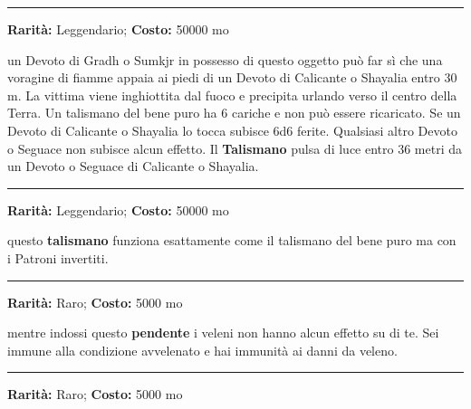 \begin{multicols}{2}
\smallskip\noindent\rule{\linewidth}{2pt}  \hypertarget{TalismanodelBenepuro}{}\smallskip{}\noindent\label{TalismanodelBenepuro}

\textbf{Rarità:} Leggendario; \textbf{Costo:} 50000 mo

un Devoto di Gradh o Sumkjr in possesso di questo oggetto può far sì che una voragine di fiamme appaia ai piedi di un Devoto di Calicante o Shayalia entro 30 m. La vittima viene inghiottita dal fuoco e precipita urlando verso il centro della Terra. Un talismano del bene puro ha 6 cariche e non può essere ricaricato. Se un Devoto di Calicante o Shayalia lo tocca subisce 6d6 ferite. Qualsiasi altro Devoto o Seguace non subisce alcun effetto. Il \textbf{Talismano} pulsa di luce entro 36 metri da un Devoto o Seguace di Calicante o Shayalia.

\smallskip\noindent\rule{\linewidth}{2pt}  \hypertarget{TalismanodelMaleestremo}{}\smallskip{}\noindent\label{TalismanodelMaleestremo}

\textbf{Rarità:} Leggendario; \textbf{Costo:} 50000 mo

questo \textbf{talismano} funziona esattamente come il talismano del bene puro ma con i Patroni invertiti.

\smallskip\noindent\rule{\linewidth}{2pt}  \hypertarget{TalismanodellaProtezionedalVeleno}{}\smallskip{}\noindent\label{TalismanodellaProtezionedalVeleno}

\textbf{Rarità:} Raro; \textbf{Costo:} 5000 mo

mentre indossi questo \textbf{pendente} i veleni non hanno alcun effetto su di te. Sei immune alla condizione avvelenato e hai immunità ai danni da veleno.

\smallskip\noindent\rule{\linewidth}{2pt}  \hypertarget{TalismanodellaSalute}{}\smallskip{}\noindent\label{TalismanodellaSalute}

\textbf{Rarità:} Raro; \textbf{Costo:} 5000 mo


\end{multicols}
